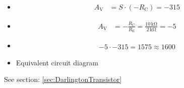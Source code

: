 {\begin{itemize}
            \item[h)]
                  \begin{align*}
                        A_\mathrm{V} & = S \cdot (-R_\mathrm{C}) = -315
                  \end{align*}
                  
            \item[i)]
                  \begin{align*}
                        A_\mathrm{V} & = -\frac{R_\mathrm{C}}{R_\mathrm{E}} = \frac{10\,\mathrm{k\Omega}}{2\,\mathrm{k\Omega}} = -5
                  \end{align*}
                  
            \item[j)]
                  \begin{align*}
                        -5 \cdot -315 = 1575 \approx 1600
                  \end{align*}
                  
            \item[k)] Equivalent circuit diagram\\
                  \begin{minipage}{\linewidth}
                        \begin{figure}[H]
                              \centering
                              
                        \end{figure}
                  \end{minipage}
      \end{itemize}
      
      See section: \ref{sec:DarlingtonTransistor}
}